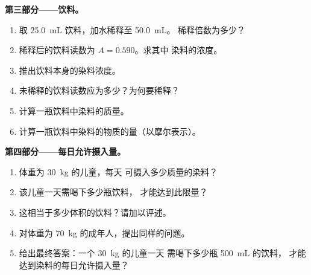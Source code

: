 \begin{problem}
\medskip
\noindent\textbf{第三部分——饮料。}
\begin{enumerate}[resume]
  \item 取 \qty{25.0}{mL} 饮料，加水稀释至 \qty{50.0}{mL}。
        稀释倍数为多少？
  \item 稀释后的饮料读数为 $A = 0.590$。求其中
        染料的浓度。
  \item 推出饮料本身的染料浓度。
  \item 未稀释的饮料读数应为多少？为何要稀释？
  \item 计算一瓶饮料中染料的质量。
  \item 计算一瓶饮料中染料的物质的量（以摩尔表示）。
\end{enumerate}

\medskip
\noindent\textbf{第四部分——每日允许摄入量。}
\begin{enumerate}[resume]
  \item 体重为 \qty{30}{kg} 的儿童，每天
        可摄入多少质量的染料？
  \item 该儿童一天需喝下多少瓶饮料，
        才能达到此限量？
  \item 这相当于多少体积的饮料？请加以评述。
  \item 对体重为 \qty{70}{kg} 的成年人，提出同样的问题。
  \item 给出最终答案：一个 \qty{30}{kg} 的儿童一天
        需喝下多少瓶 \qty{500}{mL} 的饮料，
        才能达到染料的每日允许摄入量？
\end{enumerate}
\end{problem}
